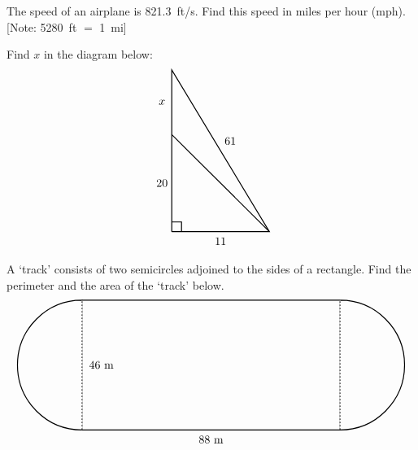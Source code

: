 \documentclass[11pt,letterpaper]{article}
\begin{document}

 The speed of an airplane is 821.3~ft/s. Find this speed in miles per hour (mph). [Note: 5280~ft $=$ 1~mi]



\newpage



 Find $x$ in the diagram below:
	\[
	\begin{tikzpicture}
	\draw[line width=0.03cm] (0,0) -- (0,5) -- (3,0) -- (0,0);
	\draw[line width=0.03cm] (0,0.3) -- (0.3,0.3) -- (0.3,0);
	\draw[line width=0.03cm] (3,0) -- (0,3);
	\node at (1.5,-0.3) {$11$};
	\node at (-0.3,1.5) {$20$};
	\node at (1.8,2.8) {$61$};
	\node at (-0.3,4.0) {$x$};
	\end{tikzpicture}
	\]



\newpage



 A `track' consists of two semicircles adjoined to the sides of a rectangle. Find the perimeter and the area of the `track' below.
	\[
	\begin{tikzpicture}
	\draw[line width=0.03cm] (0,0) -- (8,0);
	\draw[line width=0.03cm] (0,4) -- (8,4);
	\draw[line width=0.03cm] (8,4) -- (8,0) arc(-90:90:2);
	\draw[line width=0.03cm] (0,0) -- (0,4) arc(90:270:2);
	\draw[line width=0.04cm,white] (0,0.015) -- (0,3.985);
	\draw[line width=0.03cm,dotted] (0,0.015) -- (0,3.985);
	\draw[line width=0.04cm,white] (8,0.015) -- (8,3.985);
	\draw[line width=0.03cm,dotted] (8,0.015) -- (8,3.985);
	\node at (4,-0.3) {$88$~m};
	\node at (0.6,2) {$46$~m};
	\end{tikzpicture}
	\]
\end{document}
